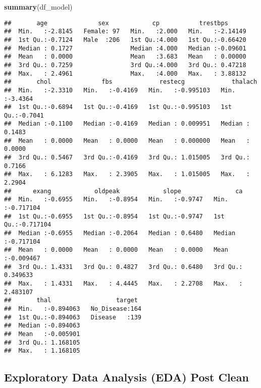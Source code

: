 \documentclass[
]{article}
\newenvironment{Shaded}{\begin{snugshade}}{\end{snugshade}}
\newcommand{\FunctionTok}[1]{\textcolor[rgb]{0.13,0.29,0.53}{\textbf{#1}}}
\newcommand{\NormalTok}[1]{#1}
\begin{document}
\begin{Shaded}
\begin{Highlighting}[]
\FunctionTok{summary}\NormalTok{(df\_model)}
\end{Highlighting}
\end{Shaded}

\begin{verbatim}
##       age              sex            cp           trestbps       
##  Min.   :-2.8145   Female: 97   Min.   :2.000   Min.   :-2.14149  
##  1st Qu.:-0.7124   Male  :206   1st Qu.:4.000   1st Qu.:-0.66420  
##  Median : 0.1727                Median :4.000   Median :-0.09601  
##  Mean   : 0.0000                Mean   :3.683   Mean   : 0.00000  
##  3rd Qu.: 0.7259                3rd Qu.:4.000   3rd Qu.: 0.47218  
##  Max.   : 2.4961                Max.   :4.000   Max.   : 3.88132  
##       chol              fbs             restecg             thalach       
##  Min.   :-2.3310   Min.   :-0.4169   Min.   :-0.995103   Min.   :-3.4364  
##  1st Qu.:-0.6894   1st Qu.:-0.4169   1st Qu.:-0.995103   1st Qu.:-0.7041  
##  Median :-0.1100   Median :-0.4169   Median : 0.009951   Median : 0.1483  
##  Mean   : 0.0000   Mean   : 0.0000   Mean   : 0.000000   Mean   : 0.0000  
##  3rd Qu.: 0.5467   3rd Qu.:-0.4169   3rd Qu.: 1.015005   3rd Qu.: 0.7166  
##  Max.   : 6.1283   Max.   : 2.3905   Max.   : 1.015005   Max.   : 2.2904  
##      exang            oldpeak            slope               ca           
##  Min.   :-0.6955   Min.   :-0.8954   Min.   :-0.9747   Min.   :-0.717104  
##  1st Qu.:-0.6955   1st Qu.:-0.8954   1st Qu.:-0.9747   1st Qu.:-0.717104  
##  Median :-0.6955   Median :-0.2064   Median : 0.6480   Median :-0.717104  
##  Mean   : 0.0000   Mean   : 0.0000   Mean   : 0.0000   Mean   :-0.009467  
##  3rd Qu.: 1.4331   3rd Qu.: 0.4827   3rd Qu.: 0.6480   3rd Qu.: 0.349633  
##  Max.   : 1.4331   Max.   : 4.4445   Max.   : 2.2708   Max.   : 2.483107  
##       thal                  target   
##  Min.   :-0.894063   No_Disease:164  
##  1st Qu.:-0.894063   Disease   :139  
##  Median :-0.894063                   
##  Mean   :-0.005901                   
##  3rd Qu.: 1.168105                   
##  Max.   : 1.168105
\end{verbatim}

\subsection{Exploratory Data Analysis (EDA) Post
Clean}\label{exploratory-data-analysis-eda-post-clean}
\end{document}
